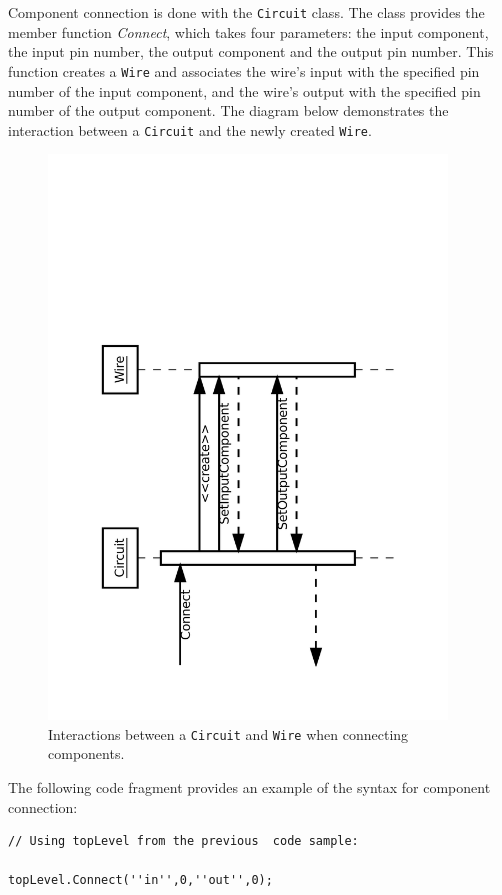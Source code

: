 \documentclass{article}
\newcommand{\ClassName}[1]{\texttt{#1}}
\newcommand{\FunctionName}[1]{\textit{#1}}
\begin{document}
Component connection is done with the \ClassName{Circuit} class. The class provides the member function \FunctionName{Connect}, which takes four parameters: the input component, the input pin number, the output component and the output pin number. This function creates a \ClassName{Wire} and associates the wire's input with the specified pin number of the input component, and the wire's output with the specified pin number of the output component. The diagram below demonstrates the interaction between a \ClassName{Circuit} and the newly created \ClassName{Wire}.

\begin{figure}[H]
    \begin{center}
        \includegraphics[angle=270,width=300pt]{imgs/ComponentConnectionInteraction.pdf}
    \end{center}
    \caption{Interactions between a \ClassName{Circuit} and \ClassName{Wire} when connecting components.}
\end{figure}

The following code fragment provides an example of the syntax for component connection:

\begin{lstlisting}
// Using topLevel from the previous  code sample:

topLevel.Connect(''in'',0,''out'',0);
\end{lstlisting}
\end{document}
